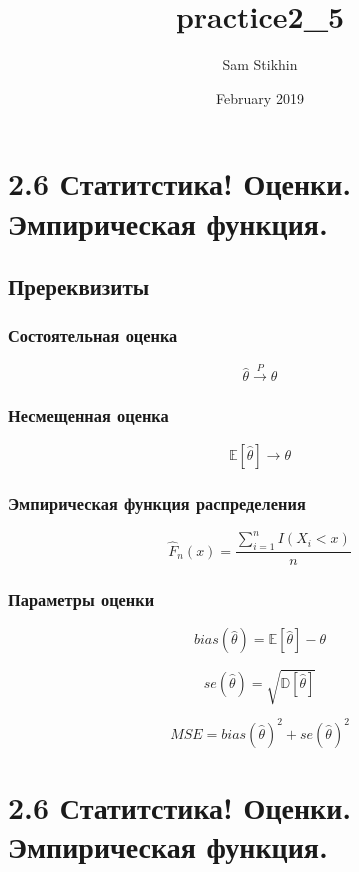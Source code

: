 \documentclass[a4paper, 14pt]{extarticle}
\title{practice2_5}
\author{Sam Stikhin}
\date{February 2019}
\begin{document}
\section*{2.6 Статитстика! Оценки. Эмпирическая функция.}
\subsection*{Пререквизиты}
\subsubsection*{Состоятельная оценка}

$$\hat\theta \xrightarrow{P} \theta$$

\subsubsection*{Несмещенная оценка}

$$\mathbb{E}[\hat\theta] \to \theta$$


\subsubsection*{Эмпирическая функция распределения}

$$\hat F_{n}(x) = \frac{\sum_{i=1}^{n}I(X_i<x)}{n}$$

\subsubsection*{Параметры оценки}

$$bias(\hat\theta) = \mathbb{E}[\hat\theta] - \theta$$

$$se(\hat\theta) = \sqrt{\mathbb{D}[\hat\theta]}$$

$$MSE = bias(\hat\theta)^2 + se(\hat\theta)^2$$
\newpage
\section*{2.6 Статитстика! Оценки. Эмпирическая функция.}
\end{document}
